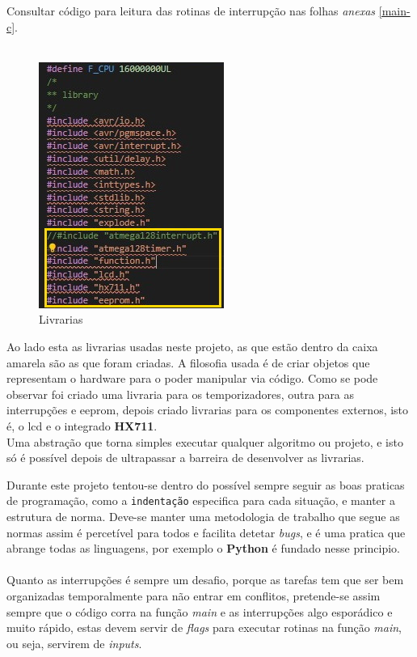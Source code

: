 Consultar código para leitura das rotinas de interrupção nas folhas \textit{anexas} \ref{main-c}.
\\
\\
\begin{minipage}{.40\linewidth}
\begin{figure}[H]
	\flushleft
	\captionsetup{justification=raggedright,singlelinecheck=false}
	\includegraphics[scale=0.9]{./image/PESTA/Code/Livrarias.jpg}
	\caption{Livrarias}
	\label{Livrarias}
\end{figure}
\end{minipage}
\begin{minipage}{.6\linewidth}
Ao lado esta as livrarias usadas neste projeto, as que estão dentro da caixa amarela são as que foram criadas.
A filosofia usada é de criar objetos que representam o hardware para o poder manipular via código. Como se pode observar foi criado uma livraria para os temporizadores, outra para as interrupções e \ac{eeprom}, depois criado livrarias para os componentes externos, isto é, o \acs{lcd} e o integrado \textbf{HX711}.
\\
Uma abstração que torna simples executar qualquer algoritmo ou projeto, e isto só é possível depois de ultrapassar a barreira de desenvolver as livrarias.
\end{minipage}
Durante este projeto tentou-se dentro do possível sempre seguir as boas praticas de programação, como a \texttt{indentação} especifica para cada situação, e manter a estrutura de norma. Deve-se manter uma metodologia de trabalho que segue as normas assim é percetível para todos e facilita detetar \textit{bugs}, e é uma pratica que abrange todas as linguagens, por exemplo o \textbf{Python} é fundado nesse principio.
\\
\\
Quanto as interrupções é sempre um desafio, porque as tarefas tem que ser bem organizadas temporalmente para não entrar em conflitos, pretende-se assim sempre que o código corra na função \textit{main} e as interrupções algo esporádico e muito rápido, estas devem servir de \textit{flags} para executar rotinas na função \textit{main}, ou seja, servirem de \textit{inputs}. %
\newpage
